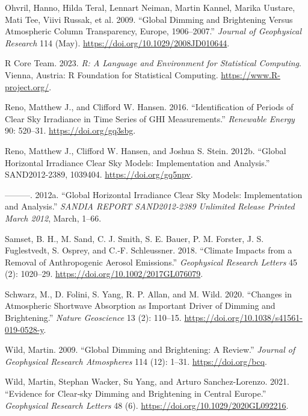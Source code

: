 \documentclass[
]{article}
\newlength{\cslhangindent}
\newlength{\cslentryspacingunit} %
\newenvironment{CSLReferences}[2] %
 {%
  \setlength{\parindent}{0pt}
  \ifodd #1
  \let\oldpar\par
  \def\par{\hangindent=\cslhangindent\oldpar}
  \fi
  \setlength{\parskip}{#2\cslentryspacingunit}
 }%
 {}
\begin{document}
\begin{CSLReferences}{1}{0}
\leavevmode{}%
Ohvril, Hanno, Hilda Teral, Lennart Neiman, Martin Kannel, Marika Uustare, Mati Tee, Viivi Russak, et al. 2009. {``Global Dimming and Brightening Versus Atmospheric Column Transparency, Europe, 1906--2007.''} \emph{Journal of Geophysical Research} 114 (May). \url{https://doi.org/10.1029/2008JD010644}.

\leavevmode{}%
R Core Team. 2023. \emph{R: A Language and Environment for Statistical Computing}. Vienna, Austria: R Foundation for Statistical Computing. \url{https://www.R-project.org/}.

\leavevmode{}%
Reno, Matthew J., and Clifford W. Hansen. 2016. {``Identification of Periods of Clear Sky Irradiance in Time Series of GHI Measurements.''} \emph{Renewable Energy} 90: 520--31. \url{https://doi.org/gq3sbg}.

\leavevmode{}%
Reno, Matthew J., Clifford W. Hansen, and Joshua S. Stein. 2012b. {``Global Horizontal Irradiance Clear Sky Models: Implementation and Analysis.''} SAND2012-2389, 1039404. \url{https://doi.org/gq5npv}.

\leavevmode{}%
---------. 2012a. {``{Global Horizontal Irradiance Clear Sky Models: Implementation and Analysis}.''} \emph{SANDIA REPORT SAND2012-2389 Unlimited Release Printed March 2012}, March, 1--66.

\leavevmode{}%
Samset, B. H., M. Sand, C. J. Smith, S. E. Bauer, P. M. Forster, J. S. Fuglestvedt, S. Osprey, and C.‐F. Schleussner. 2018. {``Climate Impacts from a Removal of Anthropogenic Aerosol Emissions.''} \emph{Geophysical Research Letters} 45 (2): 1020--29. \url{https://doi.org/10.1002/2017GL076079}.

\leavevmode{}%
Schwarz, M., D. Folini, S. Yang, R. P. Allan, and M. Wild. 2020. {``Changes in Atmospheric Shortwave Absorption as Important Driver of Dimming and Brightening.''} \emph{Nature Geoscience} 13 (2): 110--15. \url{https://doi.org/10.1038/s41561-019-0528-y}.

\leavevmode{}%
Wild, Martin. 2009. {``Global Dimming and Brightening: A Review.''} \emph{Journal of Geophysical Research Atmospheres} 114 (12): 1--31. \url{https://doi.org/bcq}.

\leavevmode{}%
Wild, Martin, Stephan Wacker, Su Yang, and Arturo Sanchez-Lorenzo. 2021. {``Evidence for Clear‐sky Dimming and Brightening in Central Europe.''} \emph{Geophysical Research Letters} 48 (6). \url{https://doi.org/10.1029/2020GL092216}.


\end{CSLReferences}
\end{document}
